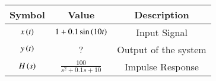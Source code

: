 \begin{tabular}{|c|c|c|}
    \hline
   Symbol & Value & Description \\
    \hline
    $x\left(t\right)$ & $1+0.1\sin{\ensuremath{\left(10t\right)}}$ & Input Signal\\ [2ex]
    \hline
    $y\left(t\right)$ & ? & Output of the system\\[2ex]
    \hline 
    $H\left(s\right)$ & $\frac{100}{s^2+0.1s+10}$ & Impulse Response\\[2ex]
    \hline
\end{tabular}